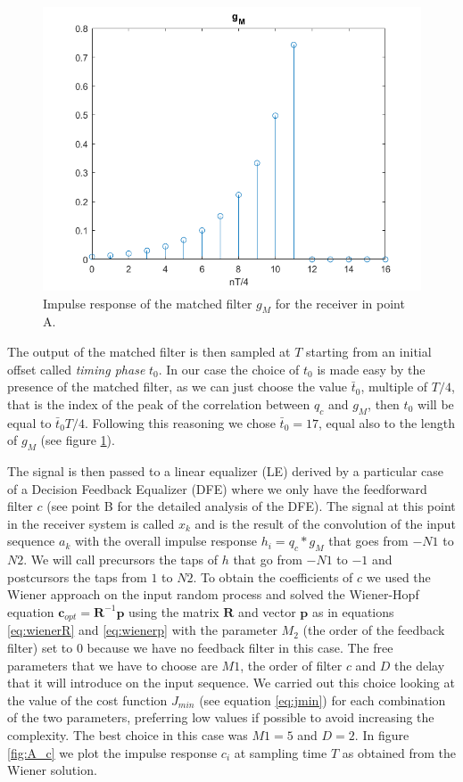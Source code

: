 \documentclass[a4paper,11.5pt]{article}
\newcommand{\vt}{\boldsymbol}
\begin{document}
\begin{figure}[ht]
	\begin{center}   
		\includegraphics[width=\textwidth]{figs/A_gm.png} 
		\caption{Impulse response of the matched filter $g_{M}$ for the receiver in point A.}
		\label{fig:A_gm}
	\end{center}
\end{figure} 

The output of the matched filter is then sampled at $T$ starting from an initial offset called \emph{timing phase} $t_0$. In our case the choice of $t_0$ is made easy by the presence of the matched filter, as we can just choose the value $\bar{t}_0$, multiple of $T/4$, that is the index of the peak of the correlation between $q_c$ and $g_M$, then $t_0$ will be equal to $\bar{t}_0 T/4$. Following this reasoning we chose $\bar{t}_0=17$, equal also to the length of $g_M$ (see figure \ref{fig:A_gm}).

The signal is then passed to a linear equalizer (LE) derived by a particular case of a Decision Feedback Equalizer (DFE) where we only have the feedforward filter $c$ (see point B for the detailed analysis of the DFE). The signal at this point in the receiver system is called $x_k$ and is the result of the convolution of the input sequence $a_k$ with the overall impulse response $h_i = q_c * g_M$ that goes from $-N1$ to $N2$. We will call precursors the taps of $h$ that go from $-N1$ to $-1$ and postcursors the taps from $1$ to $N2$. To obtain the coefficients of $c$ we used the Wiener approach on the input random process and solved the Wiener-Hopf equation $\vt{c}_{opt}=\vt{R}^{-1}\vt{p}$ using the matrix $\vt{R}$ and vector $\vt{p}$ as in equations \ref{eq:wienerR} and \ref{eq:wienerp} with the parameter $M_2$ (the order of the feedback filter) set to $0$ because we have no feedback filter in this case. The free parameters that we have to choose are $M1$, the order of filter $c$ and $D$ the delay that it will introduce on the input sequence. We carried out this choice looking at the value of the cost function $J_{min}$ (see equation \ref{eq:jmin}) for each combination of the two parameters, preferring low values if possible to avoid increasing the complexity. The best choice in this case was $M1=5$ and $D=2$.
In figure \ref{fig:A_c} we plot the impulse response $c_i$ at sampling time $T$ as obtained from the Wiener solution. 
\end{document}
